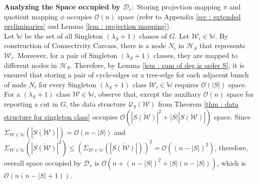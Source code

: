 \documentclass[letterpaper,11pt]{article}
\begin{document}
\noindent
\textbf{Analyzing the Space occupied by ${\mathcal D}_s:$} Storing projection mapping $\pi$ and quotient mapping $\phi$ occupies ${\mathcal O}(n)$ space (refer to Appendix \ref{sec : extended preliminaries} and Lemma \ref{lem : projection mapping}). \\
Let ${\mathbb W}$ be the set of all Singleton $(\lambda_S+1)$ classes of $G$. Let ${\mathcal W}_i\in {\mathbb W}$. By construction of Connectivity Carcass, there is a node $N_i$ in ${\mathcal H}_S$ that represents ${\mathcal W}_i$. Moreover, for a pair of Singleton $(\lambda_S+1)$ classes, they are mapped to different nodes in ${\mathcal H}_S$.
Therefore, by Lemma \ref{lem : sum of deg is order S}, it is ensured that storing a pair of cycle-edges or a tree-edge for each adjacent bunch of node $N_i$ for every Singleton $(\lambda_S+1)$ class ${\mathcal W}_i\in {\mathbb W}$ requires ${\mathcal O}(|S|)$ space.\\
For a $(\lambda_S+1)$ class ${\mathcal W}\in {\mathbb W}$, observe that, except the auxiliary ${\mathcal O}(n)$ space for reporting a cut in $G$, the data structure ${\mathcal Q}_S({\mathcal W})$ from Theorem \ref{thm : data structure for singleton class} occupies ${\mathcal O}(|\overline{S({\mathcal W})}|^2+|S||\overline{S({\mathcal W})}|)$ space. 
Since $\Sigma_{{\mathcal W}\in {\mathbb W}}(|\overline{S({\mathcal W})}|) ={\mathcal O}(n-|S|)$ and  $\Sigma_{{\mathcal W}\in {\mathbb W}}(|\overline{S({\mathcal W})}|^2)\le (\Sigma_{{\mathcal W}\in {\mathbb W}}(|\overline{S({\mathcal W})}|))^2={\mathcal O}((n-|S|)^2)$, therefore, overall space occupied by ${\mathcal D}_s$ is ${\mathcal O}(n+(n-|S|)^2+|S|(n-|S|))$, which is ${\mathcal O}(n(n-|S|+1))$.\\
\end{document}
